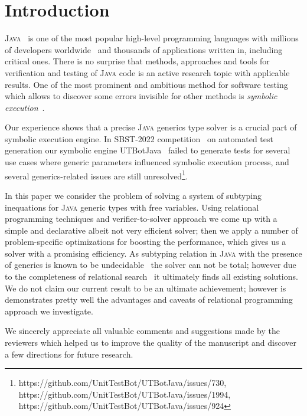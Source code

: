 \section{Introduction}
\label{sec:intro}

\textsc{Java}~\cite{java} is one of the most popular high-level programming languages with millions of developers worldwide~\cite{tiobe} and
thousands of applications written in, including critical ones. There is no surprise that methods, approaches and tools for verification and testing
of \textsc{Java} code is an active research topic with applicable results. One of the most prominent and ambitious method for software testing  which
allows to discover some errors invisible for other methods is \emph{symbolic execution}~\cite{Symbolic}.

Our experience shows that a precise \textsc{Java} generics type solver is a crucial part of symbolic execution engine. In SBST-2022 competition~\cite{SBCT} on
automated test generation our symbolic engine UTBotJava~\cite{UTBot} failed to generate tests for several use cases where generic parameters influenced
symbolic execution process, and several generics-related issues are still unresolved\footnote{https://github.com/UnitTestBot/UTBotJava/issues/730, https://github.com/UnitTestBot/UTBotJava/issues/1994, https://github.com/UnitTestBot/UTBotJava/issues/924}.

In this paper we consider the problem of solving a system of subtyping inequations for \textsc{Java} generic types with free variables. Using relational programming techniques and
verifier-to-solver approach we come up with a simple and declarative albeit not very efficient solver; then we apply a number of problem-specific optimizations for boosting the performance,
which gives us a solver with a promising efficiency. As subtyping relation in \textsc{Java} with the presence of generics is known to be undecidable~\cite{JGTC} the solver can not be total;
however due to the completeness of relational search~\cite{certified} it ultimately finds all existing solutions. We do not claim our current result to be an ultimate achievement; 
however is demonstrates pretty well the advantages and caveats of relational programming approach we investigate.

We sincerely appreciate all valuable comments and suggestions made by the reviewers which helped us to improve the quality of the manuscript and discover a few directions for future research.

